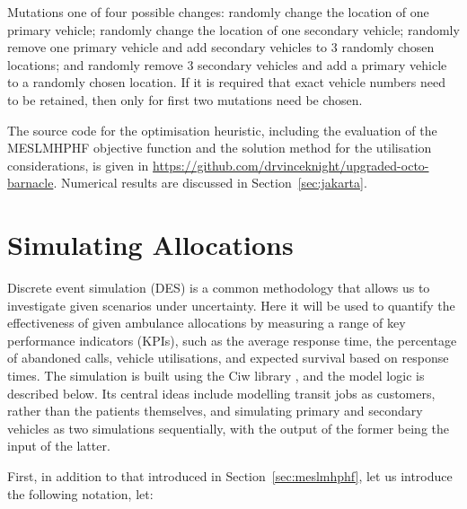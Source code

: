 \documentclass[preprint,12pt]{elsarticle}
\begin{document}
Mutations one of four possible changes: randomly change the location of one
primary vehicle; randomly change the location of one secondary vehicle;
randomly remove one primary vehicle and add secondary vehicles to 3 randomly
chosen locations; and randomly remove 3 secondary vehicles and add a primary
vehicle to a randomly chosen location. If it is required that exact vehicle
numbers need to be retained, then only for first two mutations need be chosen.

The source code for the optimisation heuristic, including the evaluation of
the MESLMHPHF objective function and the solution method for the utilisation
considerations, is given in
\url{https://github.com/drvinceknight/upgraded-octo-barnacle}.
Numerical results are discussed in Section~\ref{sec:jakarta}.




\section{Simulating Allocations}\label{sec:simulation}
Discrete event simulation (DES) is a common methodology that allows us to
investigate given scenarios under uncertainty. Here it will be used to
quantify the effectiveness of given ambulance allocations by measuring a range
of key performance indicators (KPIs), such as the average response time, the
percentage of abandoned calls, vehicle utilisations, and expected survival
based on response times. The simulation is built using the Ciw library
\cite{palmer2019ciw}, and the model logic is described below. Its central
ideas include modelling transit jobs as customers, rather than the patients
themselves, and simulating primary and secondary vehicles as two simulations
sequentially, with the output of the former being the input of the latter.

First, in addition to that introduced in Section~\ref{sec:meslmhphf}, let us
introduce the following notation, let:
\end{document}
